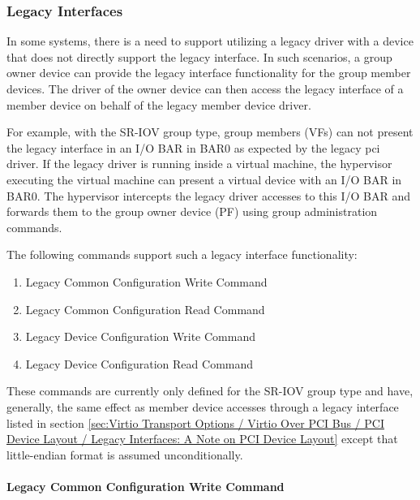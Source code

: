 \subsubsection{Legacy Interfaces}\label{sec:Basic Facilities of a Virtio Device / Device groups / Group
administration commands / Legacy Interface}

In some systems, there is a need to support utilizing a legacy driver with
a device that does not directly support the legacy interface. In such scenarios,
a group owner device can provide the legacy interface functionality for the
group member devices. The driver of the owner device can then access the legacy
interface of a member device on behalf of the legacy member device driver.

For example, with the SR-IOV group type, group members (VFs) can not present
the legacy interface in an I/O BAR in BAR0 as expected by the legacy pci driver.
If the legacy driver is running inside a virtual machine, the hypervisor
executing the virtual machine can present a virtual device with an I/O BAR in
BAR0. The hypervisor intercepts the legacy driver accesses to this I/O BAR and
forwards them to the group owner device (PF) using group administration commands.

The following commands support such a legacy interface functionality:

\begin{enumerate}
\item Legacy Common Configuration Write Command
\item Legacy Common Configuration Read Command
\item Legacy Device Configuration Write Command
\item Legacy Device Configuration Read Command
\end{enumerate}

These commands are currently only defined for the SR-IOV group type and
have, generally, the same effect as member device accesses through a legacy
interface listed in section \ref{sec:Virtio Transport Options / Virtio Over PCI
Bus / PCI Device Layout / Legacy Interfaces: A Note on PCI Device Layout} except
that little-endian format is assumed unconditionally.

\paragraph{Legacy Common Configuration Write Command}\label{par:Basic Facilities of a Virtio Device / Device groups / Group
administration commands / Legacy Interface / Legacy Common Configuration Write Command}

